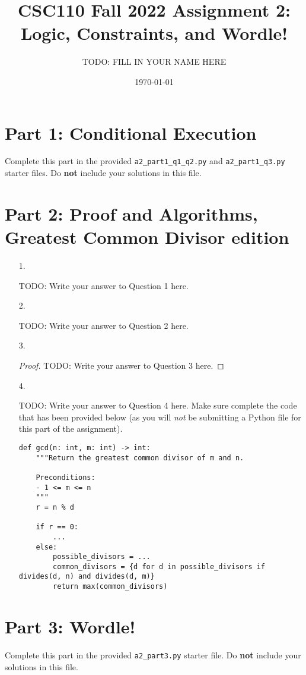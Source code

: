 \documentclass[11pt]{article}
\title{CSC110 Fall 2022 Assignment 2: Logic, Constraints, and Wordle!}
\author{TODO: FILL IN YOUR NAME HERE}
\date{\today}
\begin{document}
\maketitle

\section*{Part 1: Conditional Execution}

Complete this part in the provided \texttt{a2\_part1\_q1\_q2.py} and \texttt{a2\_part1\_q3.py} starter files.
Do \textbf{not} include your solutions in this file.

\section*{Part 2: Proof and Algorithms, Greatest Common Divisor edition}

\begin{enumerate}
\item[1.]

TODO: Write your answer to Question 1 here.

\item[2.]

TODO: Write your answer to Question 2 here.

\item[3.]

\begin{proof}
TODO: Write your answer to Question 3 here.

\end{proof}

\item[4.]

TODO: Write your answer to Question 4 here.
Make sure complete the code that has been provided below (as you will \emph{not} be submitting a Python file for this part of the assignment).

\begin{verbatim}
def gcd(n: int, m: int) -> int:
    """Return the greatest common divisor of m and n.

    Preconditions:
    - 1 <= m <= n
    """
    r = n % d

    if r == 0:
        ...
    else:
        possible_divisors = ...
        common_divisors = {d for d in possible_divisors if divides(d, n) and divides(d, m)}
        return max(common_divisors)
\end{verbatim}
\end{enumerate}


\section*{Part 3: Wordle!}

Complete this part in the provided \texttt{a2\_part3.py} starter file.
Do \textbf{not} include your solutions in this file.
\end{document}
